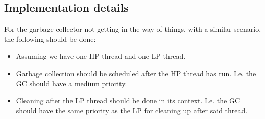 \documentclass[a4paper]{article}
\begin{document}
\subsection{Implementation details}
For the garbage collector not getting in the way of things, with a similar
scenario, the following should be done:

\begin{itemize}
  \item Assuming we have one HP thread and one LP thread.
  \item Garbage collection should be scheduled after the HP thread has run.
        I.e. the GC should have a medium priority.
  \item Cleaning after the LP thread should be done in its context. I.e. the
        GC should have the same priority as the LP for cleaning up after said
        thread.
\end{itemize}
\end{document}
